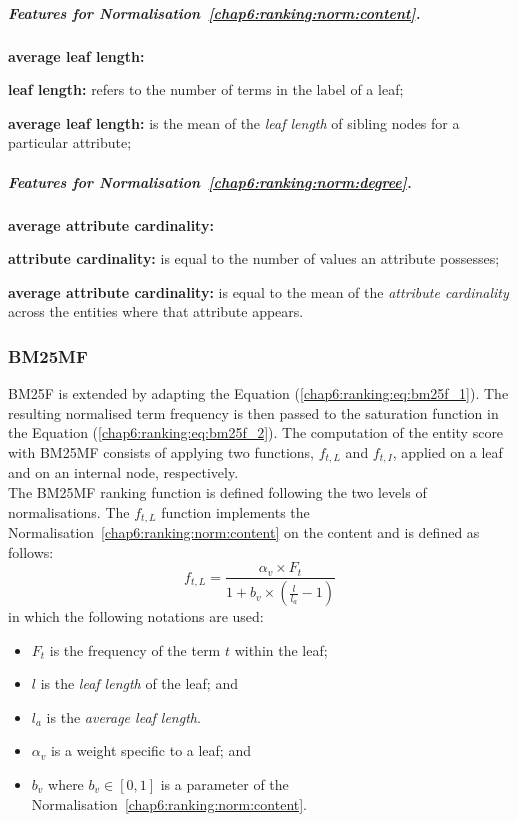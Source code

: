 \subparagraph{Features for Normalisation~\ref{chap6:ranking:norm:content}.}

\begin{labeling}{\textbf{average leaf length:}}
  \item[\textbf{leaf length:}] refers to the number of terms in the label of a leaf;
  \item[\textbf{average leaf length:}] is the mean of the \emph{leaf length} of sibling nodes for a particular attribute;
\end{labeling}

\subparagraph{Features for Normalisation~\ref{chap6:ranking:norm:degree}.}

\begin{labeling}{\textbf{average attribute cardinality:}}
  \item[\textbf{attribute cardinality:}] is equal to the number of values an attribute possesses;
  \item[\textbf{average attribute cardinality:}] is equal to the mean of the \emph{attribute cardinality} across the entities where that attribute appears.
\end{labeling}

\subsubsection{BM25MF}
\label{chap6:ranking:bm25mf-function}

BM25F is extended by adapting the Equation (\ref{chap6:ranking:eq:bm25f_1}). The resulting normalised term frequency is then passed to the saturation function in the Equation (\ref{chap6:ranking:eq:bm25f_2}).
The computation of the entity score with \gls{BM25MF} consists of applying two functions, $f_{t,L}$ and $f_{t,I}$, applied on a leaf and on an internal node, respectively.\\

The \gls{BM25MF} ranking function is defined following the two levels of normalisations.
The $f_{t,L}$ function implements the Normalisation~\ref{chap6:ranking:norm:content} on the content and is defined as follows:
\begin{equation}
\label{chap6:ranking:bm25mf_v}
f_{t,L} = \frac{\alpha_v\times F_t}{1+b_v\times\left(\frac{l}{l_a}-1\right)}
\end{equation}
in which the following notations are used:
\begin{itemize}
	\item $F_t$ is the frequency of the term $t$ within the leaf;
	\item $l$ is the \emph{leaf length} of the leaf; and
	\item $l_a$ is the \emph{average leaf length}.
	\item $\alpha_v$ is a weight specific to a leaf; and
	\item $b_v$ where $b_v \in \left[0,1\right]$ is a parameter of the Normalisation~\ref{chap6:ranking:norm:content}.
\end{itemize}

